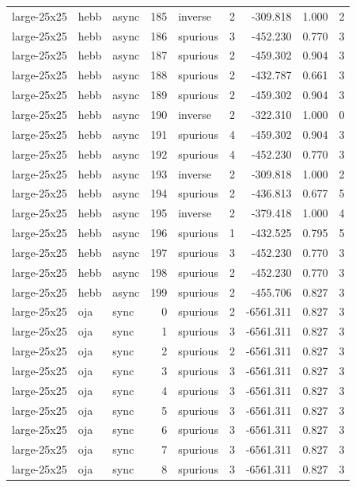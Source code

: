 \begin{tabular}{lllrlrrrr}
large-25x25 & hebb & async & 185 & inverse & 2 & -309.818 & 1.000 & 2 \\
large-25x25 & hebb & async & 186 & spurious & 3 & -452.230 & 0.770 & 3 \\
large-25x25 & hebb & async & 187 & spurious & 2 & -459.302 & 0.904 & 3 \\
large-25x25 & hebb & async & 188 & spurious & 2 & -432.787 & 0.661 & 3 \\
large-25x25 & hebb & async & 189 & spurious & 2 & -459.302 & 0.904 & 3 \\
large-25x25 & hebb & async & 190 & inverse & 2 & -322.310 & 1.000 & 0 \\
large-25x25 & hebb & async & 191 & spurious & 4 & -459.302 & 0.904 & 3 \\
large-25x25 & hebb & async & 192 & spurious & 4 & -452.230 & 0.770 & 3 \\
large-25x25 & hebb & async & 193 & inverse & 2 & -309.818 & 1.000 & 2 \\
large-25x25 & hebb & async & 194 & spurious & 2 & -436.813 & 0.677 & 5 \\
large-25x25 & hebb & async & 195 & inverse & 2 & -379.418 & 1.000 & 4 \\
large-25x25 & hebb & async & 196 & spurious & 1 & -432.525 & 0.795 & 5 \\
large-25x25 & hebb & async & 197 & spurious & 3 & -452.230 & 0.770 & 3 \\
large-25x25 & hebb & async & 198 & spurious & 2 & -452.230 & 0.770 & 3 \\
large-25x25 & hebb & async & 199 & spurious & 2 & -455.706 & 0.827 & 3 \\
large-25x25 & oja & sync & 0 & spurious & 2 & -6561.311 & 0.827 & 3 \\
large-25x25 & oja & sync & 1 & spurious & 3 & -6561.311 & 0.827 & 3 \\
large-25x25 & oja & sync & 2 & spurious & 2 & -6561.311 & 0.827 & 3 \\
large-25x25 & oja & sync & 3 & spurious & 3 & -6561.311 & 0.827 & 3 \\
large-25x25 & oja & sync & 4 & spurious & 3 & -6561.311 & 0.827 & 3 \\
large-25x25 & oja & sync & 5 & spurious & 3 & -6561.311 & 0.827 & 3 \\
large-25x25 & oja & sync & 6 & spurious & 3 & -6561.311 & 0.827 & 3 \\
large-25x25 & oja & sync & 7 & spurious & 3 & -6561.311 & 0.827 & 3 \\
large-25x25 & oja & sync & 8 & spurious & 3 & -6561.311 & 0.827 & 3 \\

\end{tabular}
